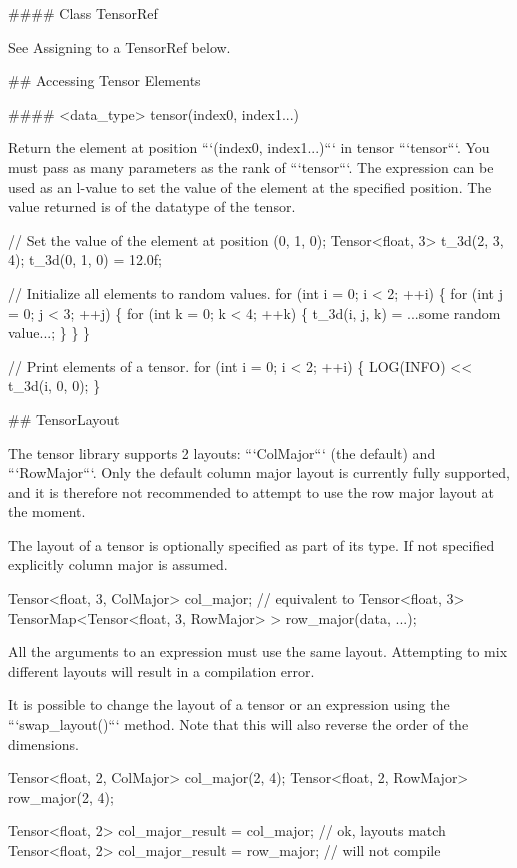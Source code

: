 \begin{DoxyCode}
#### Class TensorRef

See Assigning to a TensorRef below.

## Accessing Tensor Elements

#### <data\_type> tensor(index0, index1...)

Return the element at position ```(index0, index1...)``` in tensor
```tensor```.  You must pass as many parameters as the rank of ```tensor```.
The expression can be used as an l-value to set the value of the element at the
specified position.  The value returned is of the datatype of the tensor.

    // Set the value of the element at position (0, 1, 0);
    Tensor<float, 3> t\_3d(2, 3, 4);
    t\_3d(0, 1, 0) = 12.0f;

    // Initialize all elements to random values.
    for (int i = 0; i < 2; ++i) \{
      for (int j = 0; j < 3; ++j) \{
        for (int k = 0; k < 4; ++k) \{
          t\_3d(i, j, k) = ...some random value...;
        \}
      \}
    \}

    // Print elements of a tensor.
    for (int i = 0; i < 2; ++i) \{
      LOG(INFO) << t\_3d(i, 0, 0);
    \}


## TensorLayout

The tensor library supports 2 layouts: ```ColMajor``` (the default) and
```RowMajor```.  Only the default column major layout is currently fully
supported, and it is therefore not recommended to attempt to use the row major
layout at the moment.

The layout of a tensor is optionally specified as part of its type. If not
specified explicitly column major is assumed.

    Tensor<float, 3, ColMajor> col\_major;  // equivalent to Tensor<float, 3>
    TensorMap<Tensor<float, 3, RowMajor> > row\_major(data, ...);

All the arguments to an expression must use the same layout. Attempting to mix
different layouts will result in a compilation error.

It is possible to change the layout of a tensor or an expression using the
```swap\_layout()``` method.  Note that this will also reverse the order of the
dimensions.

    Tensor<float, 2, ColMajor> col\_major(2, 4);
    Tensor<float, 2, RowMajor> row\_major(2, 4);

    Tensor<float, 2> col\_major\_result = col\_major;  // ok, layouts match
    Tensor<float, 2> col\_major\_result = row\_major;  // will not compile


\end{DoxyCode}
